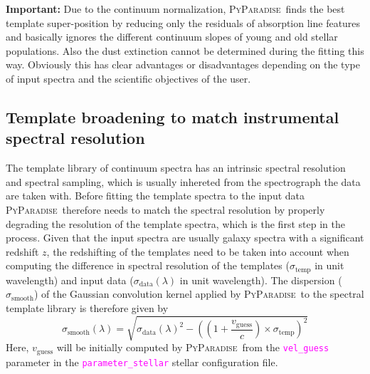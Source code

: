 \documentclass[usenatbib,usegraphicx,useAMS,onecolumn]{mn2e}
\newcommand{\codeline}[1]{\lstinline|#1|}
\newcommand{\fname}[1]{\textcolor{magenta}{\codeline{#1}}}
\newcommand{\PyPar}{\mbox{\textsc{PyParadise}}}
\begin{document}
\begin{tcolorbox}
\textbf{Important:} Due to the continuum normalization, \PyPar\ finds the best template super-position by reducing only the residuals of absorption line features and basically ignores the different continuum slopes of young and old stellar populations. Also the dust extinction cannot be determined during the fitting this way. Obviously this has clear advantages or disadvantages depending on the type of input spectra and the scientific objectives of the user. 
\end{tcolorbox}

\subsection{Template broadening to match instrumental spectral resolution}
The template library of continuum spectra has an intrinsic spectral resolution and spectral sampling, which is usually inhereted from the spectrograph the data are taken with. Before fitting the template spectra to the input data \PyPar\ therefore needs to match the spectral resolution by properly degrading the resolution of the template spectra, which is the first step in the process. Given that the input spectra are usually galaxy spectra with a significant redshift $z$, the redshifting of the templates need to be taken into account when computing the difference in spectral resolution of the templates ($\sigma_\mathrm{temp}$ in unit wavelength) and input data ($\sigma_\mathrm{data}(\lambda)$ in unit wavelength). The dispersion ($\sigma_\mathrm{smooth}$) of the Gaussian convolution kernel applied by \PyPar\ to the spectral template library is therefore given by
\begin{equation}
 \sigma_\mathrm{smooth}(\lambda) = \sqrt{\sigma_\mathrm{data}(\lambda)^2-\left(\left(1+\frac{v_\mathrm{guess}}{c}\right)\times \sigma_\mathrm{temp}\right)^2}
\end{equation}
Here, $v_\mathrm{guess}$ will be initially computed by \PyPar\ from the \fname{vel_guess} parameter in the \fname{parameter_stellar} stellar configuration file. 
\end{document}
